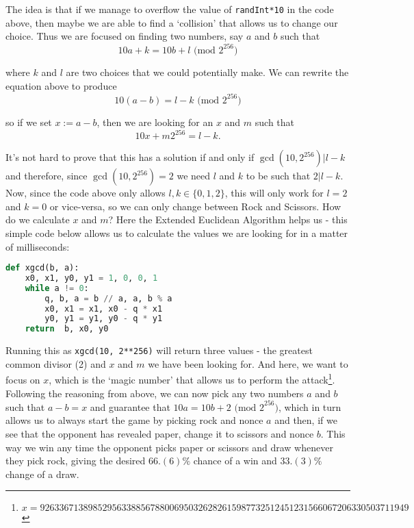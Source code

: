 \documentclass{article}
\begin{document}
    \noindent The idea is that if we manage to overflow the
    value of \verb|randInt*10| in the code above, then maybe
    we are able to find a `collision' that allows us to
    change our choice. Thus we are focused on finding two
    numbers, say \(a\) and \(b\) such that 
    \[
        10a + k = 10b + l \text{ (mod 2}^{256})
    \]

    \noindent where \(k\) and \(l\) are two choices that we could
    potentially make. We can rewrite the equation above to
    produce
    \[
        10(a-b) = l - k \text{ (mod 2}^{256})
    \]

    \noindent so if we set \(x := a - b\), then we are
    looking for an \(x\) and \(m\) such that
    \[
        10x + m2^{256} = l - k.
    \]

    \noindent It's not hard to prove that this has a
    solution if and only if \(\gcd(10, 2^{256}) | l - k\)
    and therefore, since \(\gcd(10, 2^{256}) = 2\) we need
    \(l\) and \(k\) to be such that \(2 | l - k\). Now,
    since the code above only allows \(l,k \in \{0, 1,
    2\}\), this will only work for \(l = 2\) and \(k = 0\)
    or vice-versa, so we can only change between Rock and
    Scissors. How do we calculate \(x\) and \(m\)? Here the
    Extended Euclidean Algorithm helps us - this simple code
    below allows us to calculate the values we are looking
    for in a matter of milliseconds:

    \begin{lstlisting}[language=Python]
def xgcd(b, a):
    x0, x1, y0, y1 = 1, 0, 0, 1
    while a != 0:
        q, b, a = b // a, a, b % a
        x0, x1 = x1, x0 - q * x1
        y0, y1 = y1, y0 - q * y1
    return  b, x0, y0
    \end{lstlisting}

    \noindent Running this as \verb|xgcd(10, 2**256)| will
    return three values - the greatest common divisor (2)
    and \(x\) and \(m\) we have been looking for. And here,
    we want to focus on \(x\), which is the `magic number'
    that allows us to perform the
    attack\footnote{\(x=92633671389852956338856788006950326282615987732512451231566067206330503711949\)}.
    Following the reasoning from above, we can now pick any
    two numbers \(a\) and \(b\) such that \(a - b = x\) and
    guarantee that \(10a = 10b + 2 \text{ (mod 2}^{256})\),
    which in turn allows us to always start the game by
    picking rock and nonce \(a\) and then, if we see that
    the opponent has revealed paper, change it to scissors
    and nonce \(b\). This way we win any time the opponent
    picks paper or scissors and draw whenever they pick
    rock, giving the desired \(66.(6)\%\) chance of a win
    and \(33.(3)\%\) change of a draw.
    \newline
\end{document}
